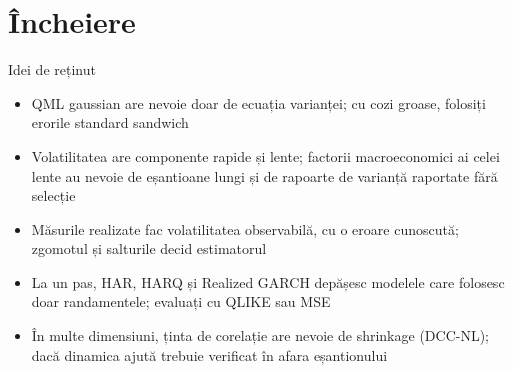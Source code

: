 \section{Încheiere}

\begin{frame}{Idei de reținut}
\itemsize{\small}
\begin{itemize}
    \item QML gaussian are nevoie doar de ecuația varianței; cu cozi groase, folosiți erorile standard sandwich
    \item Volatilitatea are componente rapide și lente; factorii macroeconomici ai celei lente au nevoie de eșantioane lungi și de rapoarte de varianță raportate fără selecție
    \item Măsurile realizate fac volatilitatea observabilă, cu o eroare cunoscută; zgomotul și salturile decid estimatorul
    \item La un pas, HAR, HARQ și Realized GARCH depășesc modelele care folosesc doar randamentele; evaluați cu QLIKE sau MSE
    \item În multe dimensiuni, ținta de corelație are nevoie de shrinkage (DCC-NL); dacă dinamica ajută trebuie verificat în afara eșantionului
\end{itemize}
\end{frame}

